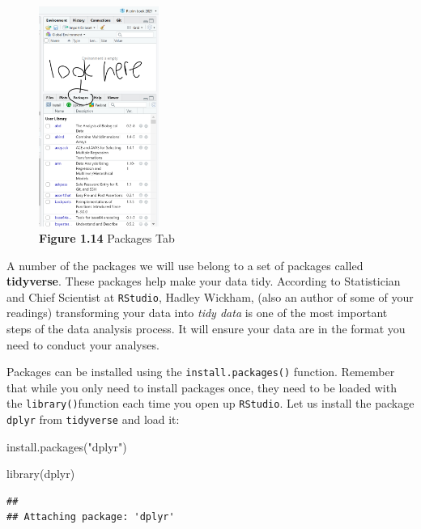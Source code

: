 \documentclass[
]{book}
\newenvironment{Shaded}{\begin{snugshade}}{\end{snugshade}}
\newcommand{\FunctionTok}[1]{\textcolor[rgb]{0.00,0.00,0.00}{#1}}
\newcommand{\NormalTok}[1]{#1}
\newcommand{\StringTok}[1]{\textcolor[rgb]{0.31,0.60,0.02}{#1}}
\begin{document}
\begin{figure}
\centering
\includegraphics[width=0.35\textwidth,height=\textheight]{Images/packages.png}
\caption{\textbf{Figure 1.14} Packages Tab}
\end{figure}

A number of the packages we will use belong to a set of packages called \textbf{tidyverse}. These packages help make your data tidy. According to Statistician and Chief Scientist at \texttt{RStudio}, Hadley Wickham, (also an author of some of your readings) transforming your data into \emph{tidy data} is one of the most important steps of the data analysis process. It will ensure your data are in the format you need to conduct your analyses.

Packages can be installed using the \texttt{install.packages()} function. Remember that while you only need to install packages once, they need to be loaded with the \texttt{library()}function each time you open up \texttt{RStudio}. Let us install the package \texttt{dplyr} from \texttt{tidyverse} and load it:

\begin{Shaded}
\begin{Highlighting}[]
\FunctionTok{install.packages}\NormalTok{(}\StringTok{"dplyr"}\NormalTok{)}
\end{Highlighting}
\end{Shaded}

\begin{Shaded}
\begin{Highlighting}[]
\FunctionTok{library}\NormalTok{(dplyr)}
\end{Highlighting}
\end{Shaded}

\begin{verbatim}
## 
## Attaching package: 'dplyr'
\end{verbatim}
\end{document}
